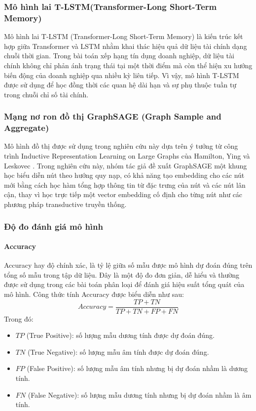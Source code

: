 \documentclass[10pt,twoside]{article}
\begin{document}
\subsubsection{Mô hình lai T-LSTM(Transformer-Long Short-Term Memory)}
Mô hình lai T-LSTM (Transformer-Long Short-Term Memory) \cite{kofune_enhancing_2026} là kiến trúc kết hợp giữa Transformer và LSTM nhằm khai thác hiệu quả dữ liệu tài chính dạng chuỗi thời gian. Trong bài toán xếp hạng tín dụng doanh nghiệp, dữ liệu tài chính không chỉ phản ánh trạng thái tại một thời điểm mà còn thể hiện xu hướng biến động của doanh nghiệp qua nhiều kỳ liên tiếp. Vì vậy, mô hình T-LSTM được sử dụng để học đồng thời các quan hệ dài hạn và sự phụ thuộc tuần tự trong chuỗi chỉ số tài chính.
\subsubsection{Mạng nơ ron đồ thị GraphSAGE (Graph Sample and Aggregate)}
Mô hình đồ thị được sử dụng trong nghiên cứu này dựa trên ý tưởng từ công trình Inductive Representation Learning on Large Graphs của Hamilton, Ying và Leskovec \cite{hamilton_inductive_2018}. Trong nghiên cứu này, nhóm tác giả đề xuất GraphSAGE một khung học biểu diễn nút theo hướng quy nạp, có khả năng tạo embedding cho các nút mới bằng cách học hàm tổng hợp thông tin từ đặc trưng của nút và các nút lân cận, thay vì học trực tiếp một vector embedding cố định cho từng nút như các phương pháp transductive truyền thống.
\subsubsection{Độ đo đánh giá mô hình} 
\paragraph{Accuracy} 
Accuracy \cite{grandini_metrics_2020} hay độ chính xác, là tỷ lệ giữa số mẫu được mô hình dự đoán đúng trên tổng số mẫu trong tập dữ liệu. Đây là một độ đo đơn giản, dễ hiểu và thường được sử dụng trong các bài toán phân loại để đánh giá hiệu suất tổng quát của mô hình. Công thức tính Accuracy được biểu diễn như sau: 
\begin{equation} Accuracy = \frac{TP + TN}{TP + TN + FP + FN} 
\end{equation} Trong đó: 
\begin{itemize} 
\item $TP$ (True Positive): số lượng mẫu dương tính được dự đoán đúng. 
\item $TN$ (True Negative): số lượng mẫu âm tính được dự đoán đúng. 
\item $FP$ (False Positive): số lượng mẫu âm tính nhưng bị dự đoán nhầm là dương tính. 
\item $FN$ (False Negative): số lượng mẫu dương tính nhưng bị dự đoán nhầm là âm tính. 
\end{itemize}
\end{document}
